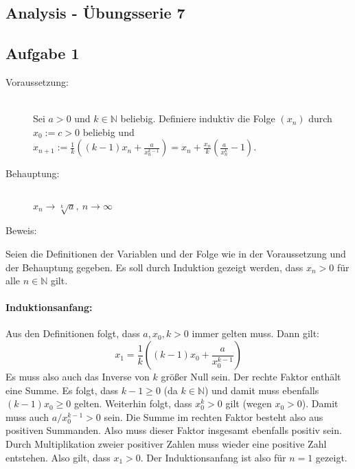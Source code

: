 \documentclass[10pt, a4paper]{article}
\begin{document}
	\begin{center}
		\section*{Analysis - Übungsserie 7} %
	\end{center}

	\subsection*{Aufgabe 1} %
	\label{sub:aufgabe_1}
	
		\begin{description}
			\item[Voraussetzung:] \hfill \\
				Sei $a > 0$ und $k \in \mathbb{N}$ beliebig. Definiere induktiv die Folge $(x_n)$ durch $x_0:=c > 0$ beliebig und\\
				$x_{n+1} := \frac{1}{k}\left( (k-1)x_n + \frac{a}{x_n^{k-1}} \right) = x_n + \frac{x_n}{k}\left( \frac{a}{x_n^k} - 1 \right)$.
			\item[Behauptung:] \hfill \\
				$x_n \longrightarrow \sqrt[k]{a}, \ n \longrightarrow \infty$
			\item[Beweis:]
		\end{description}
		
		Seien die Definitionen der Variablen und der Folge wie in der Voraussetzung und der Behauptung gegeben.
		Es soll durch Induktion gezeigt werden, dass $x_n > 0$ für alle $n \in \mathbb{N}$ gilt.

		\paragraph{Induktionsanfang:} %
		\label{par:induktionsanfang}
			
			Aus den Definitionen folgt, dass $a,x_0,k > 0$ immer gelten muss. Dann gilt:
			\[
				x_1 = \dfrac{1}{k}\left( (k-1)x_0 + \dfrac{a}{x_0^{k-1}} \right)
			\]
			Es muss also auch das Inverse von $k$ größer Null sein. Der rechte Faktor enthält eine Summe. Es folgt, dass $k-1 \geq 0$ (da $k \in \mathbb{N}$) und damit muss ebenfalls $(k-1)x_0 \geq 0$ gelten.
			Weiterhin folgt, dass $x_0^k > 0$ gilt (wegen $x_0 > 0$). Damit muss auch $a/x_0^{k-1} > 0$ sein. Die Summe im rechten Faktor besteht also aus positiven Summanden. Also muss dieser Faktor insgesamt ebenfalls positiv sein. Durch Multiplikation zweier positiver Zahlen muss wieder eine positive Zahl entstehen. Also gilt, dass $x_1 > 0$. Der Induktionsanfang ist also für $n = 1$ gezeigt.
\end{document}
